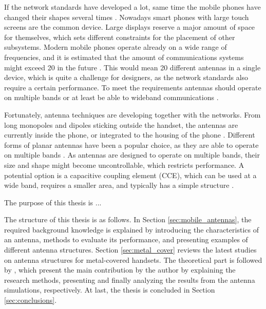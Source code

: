 If the network standards have developed a lot, same time the mobile phones have changed their shapes several times \cite{phone_evolution2,phone_evolution}. Nowadays smart phones with large touch screens are the common device. Large displays reserve a major amount of space for themselves, which sets different constraints for the placement of other subsystems. Modern mobile phones operate already on a wide range of frequencies, and it is estimated that the amount of communications systems might exceed 20 in the future \cite{20ant}. This would mean 20 different antennas in a single device, which is quite a challenge for designers, as the network standards also require a certain performance. To meet the requirements antennas should operate on multiple bands or at least be able to wideband communications \cite{lehtovuori_wideband_match}.

Fortunately, antenna techniques are developing together with the networks. From long monopoles and dipoles sticking outside the handset, the antennas are currently inside the phone, or integrated to the housing of the phone \cite{saunders,molisch}. Different forms of planar antennas have been a popular choice, as they are able to operate on multiple bands \cite{anguera}. As antennas are designed to operate on multiple bands, their size and shape might become uncontrollable, which restricts performance. A potential option is a capacitive coupling element (CCE), which can be used at a wide band, requires a smaller area, and typically has a simple structure \cite{valkonen_cce2}.

The purpose of this thesis is ...

The structure of this thesis is as follows. In Section \ref{sec:mobile_antennas}, the required background knowledge is explained by introducing the characteristics of an antenna, methods to evaluate its performance, and presenting examples of different antenna structures. Section \ref{sec:metal_cover} reviews the latest studies on antenna structures for metal-covered handsets. The theoretical part is followed by , which present the main contribution by the author by explaining the research methods, presenting and finally analyzing the results from the antenna simulations, respectively. At last, the thesis is concluded in Section \ref{sec:conclusions}.

\clearpage
